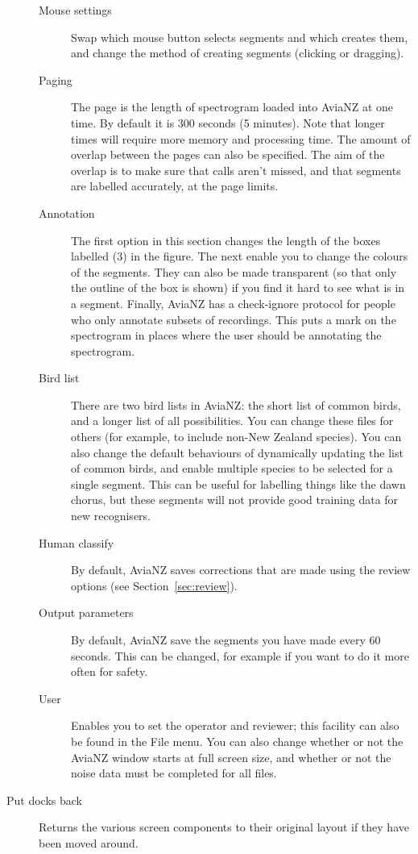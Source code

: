 \documentclass{article}
\begin{document}
\begin{description}
\begin{description}
\item[Mouse settings] Swap which mouse button selects segments and which creates them, and change the method of creating segments (clicking or dragging).
\item[Paging] The page is the length of spectrogram loaded into AviaNZ at one time. By default it is 300 seconds (5 minutes). Note that longer times will require more memory and processing time. The amount of overlap between the pages can also be specified. The aim of the overlap is to make sure that calls aren't missed, and that segments are labelled accurately, at the page limits. 
\item[Annotation] The first option in this section changes the length of the boxes labelled (3) in the figure. The next enable you to change the colours of the segments. They can also be made transparent (so that only the outline of the box is shown) if you find it hard to see what is in a segment. Finally, AviaNZ has a check-ignore protocol for people who only annotate subsets of recordings. This puts a mark on the spectrogram in places where the user should be annotating the spectrogram. 
\item[Bird list] There are two bird lists in AviaNZ: the short list of common birds, and a longer list of all possibilities. You can change these files for others (for example, to include non-New Zealand species). %
You can also change the default behaviours of dynamically updating the list of common birds, and enable multiple species to be selected for a single segment. This can be useful for labelling things like the dawn chorus, but these segments will not provide good training data for new recognisers. 
\item[Human classify] By default, AviaNZ saves corrections that are made using the review options (see Section~\ref{sec:review}). 
\item[Output parameters] By default, AviaNZ save the segments you have made every 60 seconds. This can be changed, for example if you want to do it more often for safety.
\item[User] Enables you to set the operator and reviewer; this facility can also be found in the File menu. You can also change whether or not the AviaNZ window starts at full screen size, and whether or not the noise data must be completed for all files. 
\end{description}
\item [Put docks back] Returns the various screen components to their original layout if they have been moved around. 
\end{description}
\end{document}
